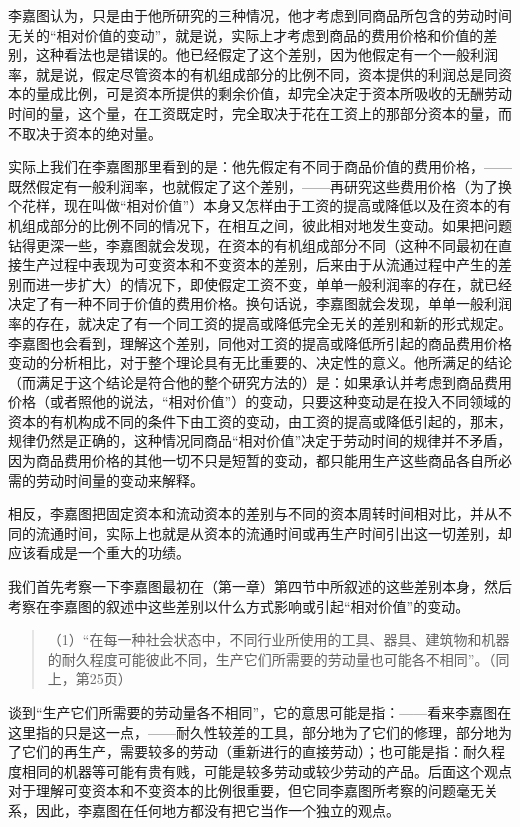 李嘉图认为，只是由于他所研究的三种情况，他才考虑到同商品所包含的劳动时间无关的“相对价值的变动”，就是说，实际上才考虑到商品的费用价格和价值的差别，这种看法也是错误的。他已经假定了这个差别，因为他假定有一个一般利润率，就是说，假定尽管资本的有机组成部分的比例不同，资本提供的利润总是同资本的量成比例，可是资本所提供的剩余价值，却完全决定于资本所吸收的无酬劳动时间的量，这个量，在工资既定时，完全取决于花在工资上的那部分资本的量，而不取决于资本的绝对量。

实际上我们在李嘉图那里看到的是：他先假定有不同于商品价值的费用价格，——既然假定有一般利润率，也就假定了这个差别，——再研究这些费用价格（为了换个花样，现在叫做“相对价值”）本身又怎样由于工资的提高或降低以及在资本的有机组成部分的比例不同的情况下，在相互之间，彼此相对地发生变动。如果把问题钻得更深一些，李嘉图就会发现，在资本的有机组成部分不同（这种不同最初在直接生产过程中表现为可变资本和不变资本的差别，后来由于从流通过程中产生的差别而进一步扩大）的情况下，即使假定工资不变，单单一般利润率的存在，就已经决定了有一种不同于价值的费用价格。换句话说，李嘉图就会发现，单单一般利润率的存在，就决定了有一个同工资的提高或降低完全无关的差别和新的形式规定。李嘉图也会看到，理解这个差别，同他对工资的提高或降低所引起的商品费用价格变动的分析相比，对于整个理论具有无比重要的、决定性的意义。他所满足的结论（而满足于这个结论是符合他的整个研究方法的）是：如果承认并考虑到商品费用价格（或者照他的说法，“相对价值”）的变动，只要这种变动是在投入不同领域的资本的有机构成不同的条件下由工资的变动，由工资的提高或降低引起的，那末，规律仍然是正确的，这种情况同商品“相对价值”决定于劳动时间的规律并不矛盾，因为商品费用价格的其他一切不只是短暂的变动，都只能用生产这些商品各自所必需的劳动时间量的变动来解释。

相反，李嘉图把固定资本和流动资本的差别与不同的资本周转时间相对比，并从不同的流通时间，实际上也就是从资本的流通时间或再生产时间引出这一切差别，却应该看成是一个重大的功绩。

我们首先考察一下李嘉图最初在（第一章）第四节中所叙述的这些差别本身，然后考察在李嘉图的叙述中这些差别以什么方式影响或引起“相对价值”的变动。

\begin{quote}{（1）“在每一种社会状态中，不同行业所使用的工具、器具、建筑物和机器的耐久程度可能彼此不同，生产它们所需要的劳动量也可能各不相同”。（同上，第25页）}\end{quote}

谈到“生产它们所需要的劳动量各不相同”，它的意思可能是指：——看来李嘉图在这里指的只是这一点，——耐久性较差的工具，部分地为了它们的修理，部分地为了它们的再生产，需要较多的劳动（重新进行的直接劳动）；也可能是指：耐久程度相同的机器等可能有贵有贱，可能是较多劳动或较少劳动的产品。后面这个观点对于理解可变资本和不变资本的比例很重要，但它同李嘉图所考察的问题毫无关系，因此，李嘉图在任何地方都没有把它当作一个独立的观点。


